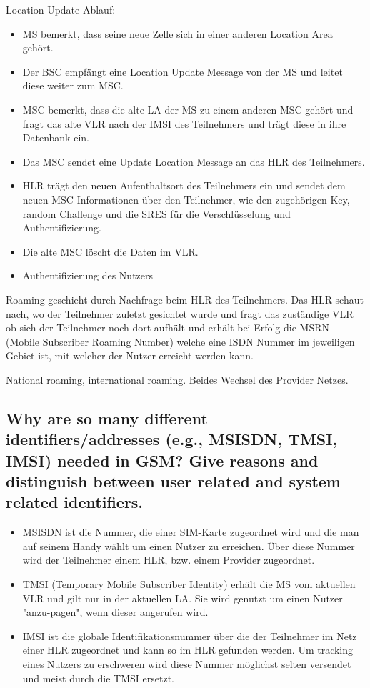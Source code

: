 Location Update Ablauf:

\begin{itemize}
\item MS bemerkt, dass seine neue Zelle sich in einer anderen Location Area gehört.
\item Der BSC empfängt eine Location Update Message von der MS und leitet diese weiter zum MSC.
\item MSC bemerkt, dass die alte LA der MS zu einem anderen MSC gehört und fragt das alte VLR nach der IMSI des Teilnehmers und trägt diese in ihre Datenbank ein.
\item Das MSC sendet eine Update Location Message an das HLR des Teilnehmers. 
\item HLR trägt den neuen Aufenthaltsort des Teilnehmers ein und sendet dem neuen MSC Informationen über den Teilnehmer, wie den zugehörigen Key, random Challenge und die SRES für die Verschlüsselung und Authentifizierung.
\item Die alte MSC löscht die Daten im VLR.
\item Authentifizierung des Nutzers
\end{itemize} 


Roaming geschieht durch Nachfrage beim HLR des Teilnehmers. Das HLR schaut nach, wo der Teilnehmer zuletzt gesichtet wurde und fragt das zuständige VLR ob sich der Teilnehmer noch dort aufhält und erhält bei Erfolg die MSRN (Mobile Subscriber Roaming Number) welche eine ISDN Nummer im jeweiligen Gebiet ist, mit welcher der Nutzer erreicht werden kann. 

National roaming, international roaming. Beides Wechsel des Provider Netzes.


\subsection{Why are so many different identifiers/addresses (e.g., MSISDN, TMSI, IMSI) needed in GSM? Give reasons and distinguish between user related and system related identifiers.}
\begin{itemize}
\item MSISDN ist die Nummer, die einer SIM-Karte zugeordnet wird und die man auf seinem Handy wählt um einen Nutzer zu erreichen. Über diese Nummer wird der Teilnehmer einem HLR, bzw. einem Provider zugeordnet.

\item TMSI (Temporary Mobile Subscriber Identity) erhält die MS vom aktuellen VLR und gilt nur in der aktuellen LA. Sie wird genutzt um einen Nutzer "anzu-pagen", wenn dieser angerufen wird.

\item IMSI ist die globale Identifikationsnummer über die der Teilnehmer im Netz einer HLR zugeordnet und kann so im HLR gefunden werden. Um tracking eines Nutzers zu erschweren wird diese Nummer möglichst selten versendet und meist durch die TMSI ersetzt.

\end{itemize}


